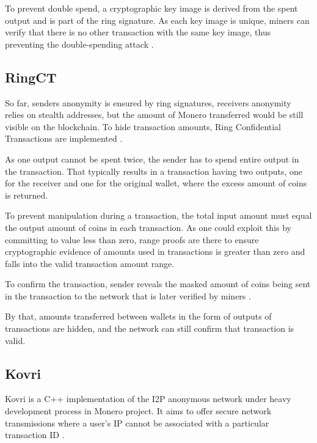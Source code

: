 \documentclass[
  printed, %
  table,   %
  nolof,     %
  nolot,     %
           oneside, color
]{fithesis3}
\begin{document}
To prevent double spend, a cryptographic key image is derived from the spent output and is part of the ring signature. As each key image is unique, miners can verify that there is no other transaction with the same key image, thus preventing the double-spending attack \cite{miller2017empirical}.


\subsection{RingCT}
\label{sec:ringct}
So far, senders anonymity is ensured by ring signatures, receivers anonymity relies on stealth addresses, but the amount of Monero transferred would be still visible on the blockchain. To hide transaction amounts, Ring Confidential Transactions are implemented \cite{noether2015ring}.

As one output cannot be spent twice, the sender has to spend entire output in the transaction. That typically results in a transaction having two outputs, one for the receiver and one for the original wallet, where the excess amount of coins is returned.	 

To prevent manipulation during a transaction, the total input amount must equal the output amount of coins in each transaction. As one could exploit this by committing to value less than zero, range proofs are there to ensure cryptographic evidence of amounts used in transactions is greater than zero and falls into the valid transaction amount range. 

To confirm the transaction, sender reveals the masked amount of coins being sent in the transaction to the network that is later verified by miners \cite{sun2017ringct}. 

By that, amounts transferred between wallets in the form of outputs of transactions are hidden, and the network can still confirm that transaction is valid.

\subsection{Kovri}
Kovri is a C++ implementation of the I2P anonymous network under heavy development process in Monero project. It aims to offer secure network transmissions where a user's IP cannot be associated with a particular transaction ID \cite{monerokovri}. 
\end{document}
